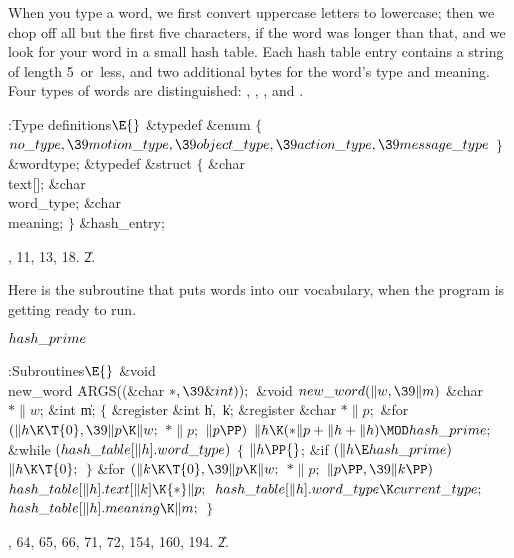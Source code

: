 \fi

When you type a word, we first convert uppercase letters to lowercase; then
we chop off all but the first five characters, if the word was longer than
that, and we look for your word in a small hash table. Each hash table entry
contains a string of length 5~or~less, and two additional bytes for the word's
type and meaning. Four types of words are distinguished: ,
, , and .

\Y\B\4:Type definitions\X${}\E{}$\6
\&{typedef} \&{enum}\5
${}\{{}$\1\6
${}\\{no\_type},\39\\{motion\_type},\39\\{object\_type},\39\\{action\_type},\39\\{message\_type}{}$\2\6
${}\}{}$ \&{wordtype};\6
\&{typedef} \&{struct} ${}\{{}$\1\6
\&{char} \\{text}[];\6
\&{char} \\{word\_type};\6
\&{char} \\{meaning};\2\6
${}\}{}$ \&{hash\_entry};\par
{}, 11, 13, 18.
\U2.\fi

Here is the subroutine that puts words into our vocabulary, when the
program is getting ready to run.

\Y\B\4\D$\\{hash\_prime}$ \5
\par
\Y\B\4:Subroutines\X${}\E{}$\6
\&{void} \\{new\_word}\,\,\.{ARGS}((\&{char} ${}{*},\39\&{int}));{}$\7
\&{void} ${}\\{new\_word}(\|w,\39\|m){}$\1\1\6
\&{char} ${}{*}\|w{}$;\6
\&{int} \|m;\2\2\6
${}\{{}$\1\6
\&{register} \&{int} \|h${},{}$ \|k;\6
\&{register} \&{char} ${}{*}\|p;{}$\7
\&{for} ${}(\|h\K\T{0},\39\|p\K\|w;{}$ ${}{*}\|p;{}$ ${}\|p\PP){}$\1\5
${}\|h\K({*}\|p+\|h+\|h)\MOD\\{hash\_prime};{}$\2\6
\&{while} ${}(\\{hash\_table}[\|h].\\{word\_type}){}$\5
${}\{{}$\1\6
${}\|h\PP{}$;\5
\&{if} ${}(\|h\E\\{hash\_prime}){}$\1\5
${}\|h\K\T{0};{}$\2\6
\4${}\}{}$\2\6
\&{for} ${}(\|k\K\T{0},\39\|p\K\|w;{}$ ${}{*}\|p;{}$ ${}\|p\PP,\39\|k\PP){}$\1\5
${}\\{hash\_table}[\|h].\\{text}[\|k]\K{*}\|p;{}$\2\6
${}\\{hash\_table}[\|h].\\{word\_type}\K\\{current\_type};{}$\6
${}\\{hash\_table}[\|h].\\{meaning}\K\|m;{}$\6
\4${}\}{}$\2\par
{}, 64, 65, 66, 71, 72, 154, 160, 194.
\U2.\fi

